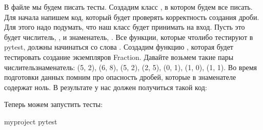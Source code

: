 \documentclass[letterpaper,10pt,russian]{sphinxmanual}
\begin{document}
\sphinxAtStartPar
В файле  мы будем писать тесты. Создадим класс , в котором будем все писать. Для начала напишем код, который будет проверять корректность создания дроби. Для этого надо подумать, что наш класс будет принимать на вход. Пусть это будет числитель, , и знаменатель, . Все функции, которые что\sphinxhyphen{}либо тестируют в pytest, должны начинаться со слова . Создадим функцию , которая будет тестировать создание экземпляров Fraction. Давайте возьмем такие пары числитель\sphinxhyphen{}знаменатель: (5, 2), (6, 8), (\sphinxhyphen{}5, 2), (2, \sphinxhyphen{}5), (0, 1), (1, 0), (1, 1). Во время подготовки данных помним про опасность дробей, которые в знаменателе содержат ноль. В результате у нас должен получиться такой код:

\begin{sphinxVerbatim}[commandchars=\\\{\}]
 
   

 
    
        
        
        
        
        
        
        
\end{sphinxVerbatim}

\sphinxAtStartPar
Теперь можем запустить тесты:

\begin{sphinxVerbatim}[commandchars=\\\{\}]
my\PYGZus{}project
pytest
\end{sphinxVerbatim}
\end{document}
